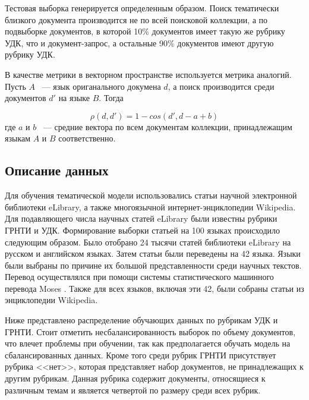 \documentclass[12pt, twoside]{article}
\begin{document}
Тестовая выборка генерируется определенным образом. Поиск тематически близкого документа производится не по всей поисковой коллекции, а по подвыборке документов, в которой 10\% документов имеет такую же рубрику УДК, что и документ-запрос, а остальные 90\% документов имеют другую рубрику УДК.

В качестве метрики в векторном пространстве используется метрика аналогий. Пусть $A$ ~--- язык ориганального докумена $d$, а поиск производится среди документов $d'$ на языке $B$. Тогда 

\[\rho(d, d') = 1 - cos(d', d - a + b)\]
где $a$ и $b$ ~--- средние вектора по всем документам коллекции, принадлежащим языкам $A$ и $B$ соответственно.

\subsection{Описание данных}

Для обучения тематической модели использовались статьи научной электронной библиотеки eLibrary\cite{eLib}, а также многоязычной интернет-энциклопедии Wikipedia\cite{wiki}. %
Для подавляющего числа научных статей eLibrary были известны рубрики ГРНТИ и УДК. Формирование выборки статьей на 100 языках происходило следующим образом. Было отобрано 24 тысячи статей библиотеки eLibrary на русском и английском языках. Затем статьи были переведены на 42 языка. Языки были выбраны по причине их большой представленности среди научных текстов. Перевод осуществлялся при помощи системы статистического машинного перевода Moses \cite{Moses}. Также для всех языков, включая эти 42, были собраны статьи из энциклопедии Wikipedia.

Ниже представлено распределение обучающих данных по рубрикам УДК и ГРНТИ. Стоит отметить несбалансированность выборок по объему документов, что влечет проблемы при обучении, так как предполагается обучать модель на сбалансированных данных. Кроме того среди рубрик ГРНТИ присутствует рубрика <<нет>>, которая представляет набор документов, не принадлежащих к другим рубрикам. Данная рубрика содержит документы, относящиеся к различным темам и является четвертой по размеру среди всех рубрик.
\end{document}
